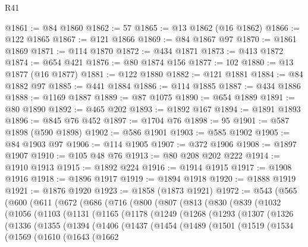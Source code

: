 \begin{lexlean}{R41}
\begin{coremodule}
@1861 := @84 @1860
@1862 := 57
@1865 := @13 @1862 (@16 @1862)
@1866 := @122 @1865
@1867 := @121 @1866
@1869 := @84 @1867 @97
@1870 := @1861 @1869
@1871 := @114 @1870
@1872 := @434 @1871
@1873 := @413 @1872
@1874 := @654 @421
@1876 := @80 @1874 @156
@1877 := 102
@1880 := @13 @1877 (@16 @1877)
@1881 := @122 @1880
@1882 := @121 @1881
@1884 := @84 @1882 @97
@1885 := @441 @1884
@1886 := @114 @1885
@1887 := @434 @1886
@1888 := @1169 @1887
@1889 := @87 @1075
@1890 := @654 @1889
@1891 := @80 @1890
@1892 := @465 @202
@1893 := @1892 @167
@1894 := @1891 @1893
@1896 := @845 @76 @452
@1897 := @1704 @76
@1898 := 95
@1901 := @587 @1898 (@590 @1898)
@1902 := @586 @1901
@1903 := @585 @1902
@1905 := @84 @1903 @97
@1906 := @114 @1905
@1907 := @372 @1906
@1908 := @1897 @1907
@1910 := @105 @48 @76
@1913 := @80 @208 @202 @222
@1914 := @1910 @1913
@1915 := @1892 @224
@1916 := @1914 @1915
@1917 := @1908 @1916
@1918 := @1896 @1917
@1919 := @1894 @1918
@1920 := @1888 @1919
@1921 := @1876 @1920
@1923 := @1858 (@1873 @1921)
@1972 := @543
    (@565
      (@600
        (@611
          (@672
            (@686
              (@716
                (@800
                  (@807
                    (@813
                      (@830
                        (@839
                          (@1032
                            (@1056
                              (@1103
                                (@1131
                                  (@1165
                                    (@1178
                                      (@1249
                                        (@1268
                                          (@1293
                                            (@1307
                                              (@1326
                                                (@1336
                                                  (@1355
                                                    (@1394
                                                      (@1406
                                                        (@1437
                                                          (@1454
                                                            (@1489
                                                              (@1501
                                                                (@1519
                                                                  (@1534
                                                                    (@1569
                                                                      (@1610
                                                                        (@1643
                                                                          (@1662

\end{coremodule}
\end{lexlean}
